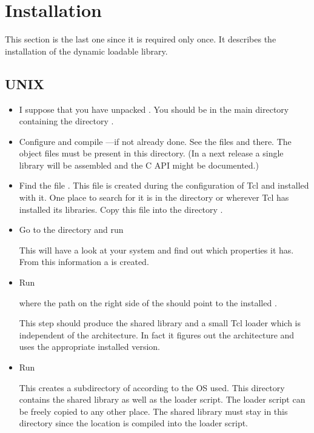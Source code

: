 \chapter{Installation}\label{sec:installation}

This section is the last one since it is required only once. It
describes the installation of the dynamic loadable library.

\section{UNIX}

\begin{itemize}
\item I suppose that you have unpacked \BibTool{}. You should be in
  the main directory containing the directory .
  
\item Configure and compile \BibTool{}---if not already done.  See the
  files  and  there.  The object files must
  be present in this directory. (In a next release a single library
  will be assembled and the C API might be documented.)
  
\item Find the file . This file is created during
  the configuration of Tcl and installed with it. One place to search
  for it is in the directory  or wherever Tcl has
  installed its libraries.  Copy this file into the directory
  .

\item Go to the directory  and run

  
  This will have a look at your system and find out which properties
  it has.  From this information a  is created.

\item  Run

  
  where the path on the right side of the \code{=} should point to the
  installed \BibTool.
  
  This step should produce the shared library and a small Tcl loader
   which is independent of the architecture.  In
  fact it figures out the architecture and uses the appropriate
  installed version.

\item Run

  
  This creates a subdirectory of  according to the OS
  used.  This directory contains the shared library as well as the
  loader script.  The loader script can be freely copied to any other
  place. The shared library must stay in this directory since the
  location is compiled into the loader script.

\end{itemize}

%
